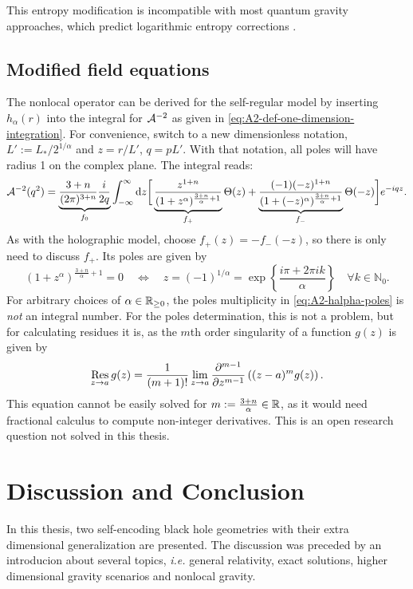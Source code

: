 \documentclass[12pt,a4paper]{report}
\numberwithin{equation}{chapter}
\begin{document}
This entropy modification is incompatible with most quantum gravity approaches, which predict logarithmic entropy corrections \cite{NS2012}.

\section{Modified field equations}
The nonlocal operator can be derived for the self-regular model by inserting $h_\alpha(r)$ into the integral for ${\cal A}^{-2}$ as given in \eqref{eq:A2-def-one-dimension-integration}.
For convenience, switch to a new dimensionless notation, $L' := L_*/2^{1/\alpha}$ and $z=r/L'$, $q=p L'$.
With that notation, all poles will have radius 1 on the complex plane. The integral reads:
\begin{equation}\label{eq:A2-halpha-def}
{\cal A}^{-2}(q^2) =
\underbrace{\frac{3+n}{(2\pi)^{3+n}} \frac{i}{2q}}_{f_0}
\int_{-\infty}^\infty
\mathrm{d} z
\bigg[
\underbrace{\frac{z^{1+n}}{(1 + z^\alpha)^{\frac{3+n}\alpha + 1} }}_{f_+} \Theta(z)
+
\underbrace{\frac{(-1)(-z)^{1+n}}{(1 + (-z)^\alpha)^{\frac{3+n}\alpha + 1} }}_{f_-} \Theta(-z)
\bigg]
e^{-i q z}.
\end{equation}
As with the holographic model, choose $f_+(z) = -f_-(-z)$, so there is only need to discuss $f_+$. Its poles are given by
\begin{equation}\label{eq:A2-halpha-poles}
(1 + z^\alpha)^{\frac{3+n}\alpha + 1} = 0
\quad\Leftrightarrow\quad
z = (-1)^{1/\alpha}
= \exp \left\{ \frac{i\pi + 2\pi ik}{\alpha} \right\}
\quad\forall k\in \mathbb{N}_0.
\end{equation}
For arbitrary choices of $\alpha \in \mathbb{R}_{\geq 0}$, the poles multiplicity in \eqref{eq:A2-halpha-poles} is \emph{not} an integral number. For the poles determination, this is not a problem, but for calculating residues it is, as the $m$th order singularity of a function $g(z)$ is given by 
\begin{equation}
\Res_{z\to a} g(z) = \frac{1}{(m+1)!} \lim_{z\to a} \frac{\partial^{m-1}}{\partial z^{m-1}} \left( (z-a)^m g(z) \right).
\end{equation}
This equation cannot be easily solved for $m:=\frac{3+n}{\alpha} \in \mathbb{R}$, as it would need fractional calculus to compute non-integer derivatives. This is an open research question not solved in this thesis.


\chapter{Discussion and Conclusion}
In this thesis, two self-encoding black hole geometries with their extra dimensional generalization are presented. The discussion was preceded by an introducion about several topics, \emph{i.e.} general relativity, exact solutions, higher dimensional gravity scenarios and nonlocal gravity.
\end{document}
